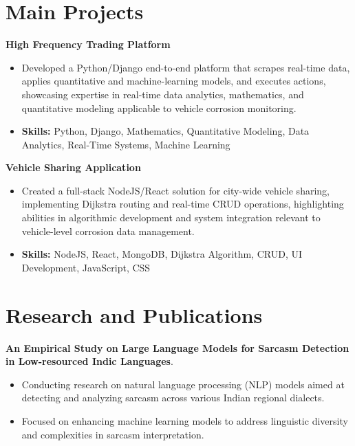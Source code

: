 \documentclass[a4paper,11pt]{article}
\begin{document}
\section{\textbf{Main Projects}}

\vspace{1mm}
  \textbf{High Frequency Trading Platform  }
\vspace{-1.5mm} %
\begin{itemize}
  \item Developed a Python/Django end-to-end platform that scrapes real-time data, applies quantitative and machine-learning models, and executes actions, showcasing expertise in real-time data analytics, mathematics, and quantitative modeling applicable to vehicle corrosion monitoring.
\vspace{-3mm}
  \item \textbf{Skills:} Python, Django, Mathematics, Quantitative Modeling, Data Analytics, Real-Time Systems, Machine Learning
\end{itemize}


\vspace{1mm}
   \textbf{Vehicle Sharing Application }
\vspace{-1.5mm} %
\begin{itemize}
  \item Created a full-stack NodeJS/React solution for city-wide vehicle sharing, implementing Dijkstra routing and real-time CRUD operations, highlighting abilities in algorithmic development and system integration relevant to vehicle-level corrosion data management.
\vspace{-3mm}
  \item \textbf{Skills:} NodeJS, React, MongoDB, Dijkstra Algorithm, CRUD, UI Development, JavaScript, CSS
\end{itemize}



\section{\textbf{Research and Publications} \hfill }
\vspace{1mm}
  \textbf{An Empirical Study on Large Language Models for Sarcasm Detection in Low-resourced Indic Languages}.
\vspace{-1mm} %
\begin{itemize}
  \item Conducting research on natural language processing (NLP) models aimed at detecting and analyzing sarcasm across various Indian regional dialects.
\vspace{-3mm}
  \item Focused on enhancing machine learning models to address linguistic diversity and complexities in sarcasm interpretation.
\end{itemize}
\end{document}
